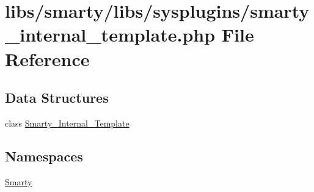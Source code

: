 \hypertarget{smarty__internal__template_8php}{}\section{libs/smarty/libs/sysplugins/smarty\+\_\+internal\+\_\+template.php File Reference}
\label{smarty__internal__template_8php}
\subsection*{Data Structures}
\begin{DoxyCompactItemize}
\item 
class \hyperlink{class_smarty___internal___template}{Smarty\+\_\+\+Internal\+\_\+\+Template}
\end{DoxyCompactItemize}
\subsection*{Namespaces}
\begin{DoxyCompactItemize}
\item 
 \hyperlink{namespace_smarty}{Smarty}
\end{DoxyCompactItemize}
